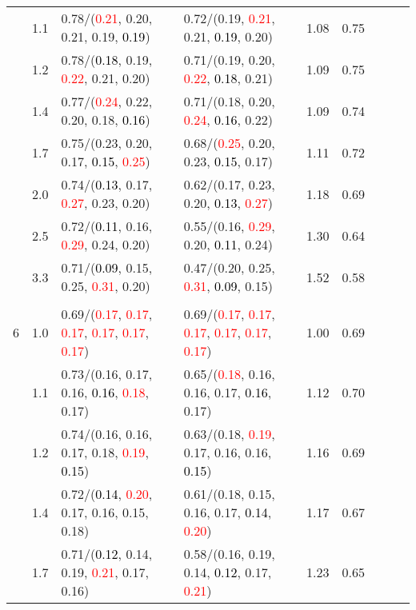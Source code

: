 \documentclass[10pt,a4paper]{report}
\begin{document}
\begin{table}[!htbp]
\begin{center}
{\begin{tabular}{ccllccccc}
			&1.1&0.78/(\textcolor{red}{0.21}, 0.20, 0.21, 0.19, \textcolor{black}{0.19})&0.72/(0.19, \textcolor{red}{0.21}, 0.21, \textcolor{black}{0.19}, 0.20)&1.08&0.75\\
			&1.2&0.78/(\textcolor{black}{0.18}, 0.19, \textcolor{red}{0.22}, 0.21, 0.20)&0.71/(0.19, 0.20, \textcolor{red}{0.22}, \textcolor{black}{0.18}, 0.21)&1.09&0.75\\
			&1.4&0.77/(\textcolor{red}{0.24}, 0.22, 0.20, 0.18, \textcolor{black}{0.16})&0.71/(0.18, 0.20, \textcolor{red}{0.24}, \textcolor{black}{0.16}, 0.22)&1.09&0.74\\
			&1.7&0.75/(0.23, 0.20, 0.17, \textcolor{black}{0.15}, \textcolor{red}{0.25})&0.68/(\textcolor{red}{0.25}, 0.20, 0.23, \textcolor{black}{0.15}, 0.17)&1.11&0.72\\
			&2.0&0.74/(\textcolor{black}{0.13}, 0.17, \textcolor{red}{0.27}, 0.23, 0.20)&0.62/(0.17, 0.23, 0.20, \textcolor{black}{0.13}, \textcolor{red}{0.27})&1.18&0.69\\
			&2.5&0.72/(\textcolor{black}{0.11}, 0.16, \textcolor{red}{0.29}, 0.24, 0.20)&0.55/(0.16, \textcolor{red}{0.29}, 0.20, \textcolor{black}{0.11}, 0.24)&1.30&0.64\\
			&3.3&0.71/(\textcolor{black}{0.09}, 0.15, 0.25, \textcolor{red}{0.31}, 0.20)&0.47/(0.20, 0.25, \textcolor{red}{0.31}, \textcolor{black}{0.09}, 0.15)&1.52&0.58\\
			&&&&\\
			6			&1.0&0.69/(\textcolor{red}{0.17}, \textcolor{red}{0.17}, \textcolor{red}{0.17}, \textcolor{red}{0.17}, \textcolor{red}{0.17}, \textcolor{red}{0.17})&0.69/(\textcolor{red}{0.17}, \textcolor{red}{0.17}, \textcolor{red}{0.17}, \textcolor{red}{0.17}, \textcolor{red}{0.17}, \textcolor{red}{0.17})&1.00&0.69\\
			&1.1&0.73/(0.16, 0.17, 0.16, \textcolor{black}{0.16}, \textcolor{red}{0.18}, 0.17)&0.65/(\textcolor{red}{0.18}, 0.16, 0.16, 0.17, \textcolor{black}{0.16}, 0.17)&1.12&0.70\\
			&1.2&0.74/(0.16, 0.16, 0.17, 0.18, \textcolor{red}{0.19}, \textcolor{black}{0.15})&0.63/(0.18, \textcolor{red}{0.19}, 0.17, 0.16, 0.16, \textcolor{black}{0.15})&1.16&0.69\\
			&1.4&0.72/(\textcolor{black}{0.14}, \textcolor{red}{0.20}, 0.17, 0.16, 0.15, 0.18)&0.61/(0.18, 0.15, 0.16, 0.17, \textcolor{black}{0.14}, \textcolor{red}{0.20})&1.17&0.67\\
			&1.7&0.71/(\textcolor{black}{0.12}, 0.14, 0.19, \textcolor{red}{0.21}, 0.17, 0.16)&0.58/(0.16, 0.19, 0.14, \textcolor{black}{0.12}, 0.17, \textcolor{red}{0.21})&1.23&0.65\\

\end{tabular}}
\end{center}
\end{table}
\end{document}
